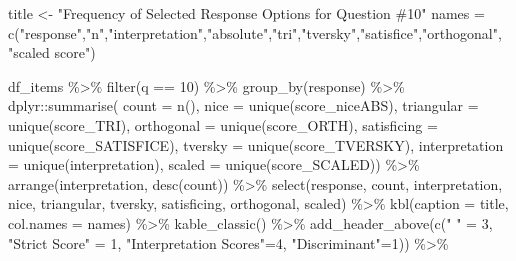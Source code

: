 \documentclass[
  letterpaper,
  DIV=11,
  numbers=noendperiod]{scrreprt}
\newenvironment{Shaded}{\begin{snugshade}}{\end{snugshade}}
\newcommand{\AttributeTok}[1]{\textcolor[rgb]{0.40,0.45,0.13}{#1}}
\newcommand{\DecValTok}[1]{\textcolor[rgb]{0.68,0.00,0.00}{#1}}
\newcommand{\FunctionTok}[1]{\textcolor[rgb]{0.28,0.35,0.67}{#1}}
\newcommand{\NormalTok}[1]{\textcolor[rgb]{0.00,0.23,0.31}{#1}}
\newcommand{\OtherTok}[1]{\textcolor[rgb]{0.00,0.23,0.31}{#1}}
\newcommand{\SpecialCharTok}[1]{\textcolor[rgb]{0.37,0.37,0.37}{#1}}
\newcommand{\StringTok}[1]{\textcolor[rgb]{0.13,0.47,0.30}{#1}}
\begin{document}
\begin{Shaded}
\begin{Highlighting}[]
\NormalTok{title }\OtherTok{\textless{}{-}} \StringTok{"Frequency of Selected Response Options for Question \#10"}
\NormalTok{names }\OtherTok{=} \FunctionTok{c}\NormalTok{(}\StringTok{"response"}\NormalTok{,}\StringTok{"n"}\NormalTok{,}\StringTok{"interpretation"}\NormalTok{,}\StringTok{"absolute"}\NormalTok{,}\StringTok{"tri"}\NormalTok{,}\StringTok{"tversky"}\NormalTok{,}\StringTok{"satisfice"}\NormalTok{,}\StringTok{"orthogonal"}\NormalTok{, }\StringTok{"scaled score"}\NormalTok{)}

\NormalTok{df\_items }\SpecialCharTok{\%\textgreater{}\%} \FunctionTok{filter}\NormalTok{(q }\SpecialCharTok{==} \DecValTok{10}\NormalTok{) }\SpecialCharTok{\%\textgreater{}\%} \FunctionTok{group\_by}\NormalTok{(response) }\SpecialCharTok{\%\textgreater{}\%}
\NormalTok{  dplyr}\SpecialCharTok{::}\FunctionTok{summarise}\NormalTok{( }\AttributeTok{count =} \FunctionTok{n}\NormalTok{(),}
                    \AttributeTok{nice =} \FunctionTok{unique}\NormalTok{(score\_niceABS),}
                    \AttributeTok{triangular =} \FunctionTok{unique}\NormalTok{(score\_TRI),}
                    \AttributeTok{orthogonal =}  \FunctionTok{unique}\NormalTok{(score\_ORTH),}
                    \AttributeTok{satisficing =}  \FunctionTok{unique}\NormalTok{(score\_SATISFICE),}
                    \AttributeTok{tversky =} \FunctionTok{unique}\NormalTok{(score\_TVERSKY),}
                    \AttributeTok{interpretation =} \FunctionTok{unique}\NormalTok{(interpretation),}
                    \AttributeTok{scaled =} \FunctionTok{unique}\NormalTok{(score\_SCALED)) }\SpecialCharTok{\%\textgreater{}\%}
  \FunctionTok{arrange}\NormalTok{(interpretation, }\FunctionTok{desc}\NormalTok{(count)) }\SpecialCharTok{\%\textgreater{}\%}
  \FunctionTok{select}\NormalTok{(response, count, interpretation, nice,}
\NormalTok{         triangular, tversky, satisficing, orthogonal, scaled) }\SpecialCharTok{\%\textgreater{}\%}
  \FunctionTok{kbl}\NormalTok{(}\AttributeTok{caption =}\NormalTok{ title, }\AttributeTok{col.names =}\NormalTok{ names) }\SpecialCharTok{\%\textgreater{}\%}  \FunctionTok{kable\_classic}\NormalTok{() }\SpecialCharTok{\%\textgreater{}\%}
  \FunctionTok{add\_header\_above}\NormalTok{(}\FunctionTok{c}\NormalTok{(}\StringTok{" "} \OtherTok{=} \DecValTok{3}\NormalTok{, }\StringTok{"Strict Score"} \OtherTok{=} \DecValTok{1}\NormalTok{, }\StringTok{"Interpretation Scores"}\OtherTok{=}\DecValTok{4}\NormalTok{, }\StringTok{"Discriminant"}\OtherTok{=}\DecValTok{1}\NormalTok{)) }\SpecialCharTok{\%\textgreater{}\%}

\end{Highlighting}
\end{Shaded}
\end{document}
